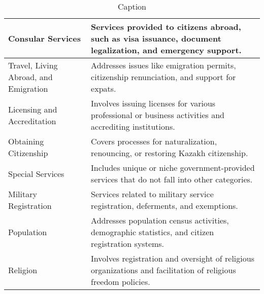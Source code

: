 \begin{table}[]
\begin{tabular}{p{}p{}}
Consular Services & Services provided to citizens abroad, such as visa issuance, document legalization, and emergency support. \\  \midrule
Travel, Living Abroad, and Emigration & Addresses issues like emigration permits, citizenship renunciation, and support for expats. \\  \midrule
Licensing and Accreditation & Involves issuing licenses for various professional or business activities and accrediting institutions. \\  \midrule
Obtaining Citizenship & Covers processes for naturalization, renouncing, or restoring Kazakh citizenship. \\  \midrule
Special Services & Includes unique or niche government-provided services that do not fall into other categories. \\  \midrule
Military Registration & Services related to military service registration, deferments, and exemptions. \\  \midrule
Population & Addresses population census activities, demographic statistics, and citizen registration systems. \\  \midrule
Religion & Involves registration and oversight of religious organizations and facilitation of religious freedom policies. \\  
\bottomrule
\end{tabular}
    \caption{Caption}
    \label{tab:my_label}
\end{table}
